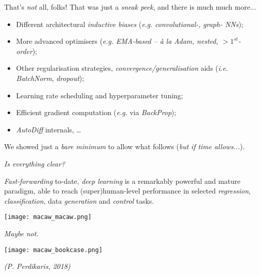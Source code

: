 {\begin{frame}{ That's \textit{not} all, folks!}
        That was just a \textit{sneak peek}, and there is much much more...
        \begin{itemize}
            \item Different architectural \alert{\textit{inductive biases}} (\textit{e.g. convolutional-, graph- NNs});
            \item More advanced optimisers (\textit{e.g. EMA-based -- à la Adam, nested, $>1^{\textit{st}}$-order});
            \item Other regularisation strategies, \textit{convergence/generalisation} aids (\textit{i.e.} \textit{BatchNorm}, \textit{dropout});
            \item Learning rate scheduling and hyperparameter tuning;
            \item \alert{Efficient} gradient computation (\textit{e.g.} via \textit{BackProp});
            \item \textit{AutoDiff} internals, \etc\dots
        \end{itemize}
    \hfill\break
    We showed just a \textit{bare minimum} to allow what follows (\textit{but if time allows...}).

    \end{frame}

    \begin{frame}{ \textit{Is everything clear?}}

    \textit{Fast-forwarding} to-date, \textit{deep learning} is a remarkably powerful and mature paradigm, able to reach (super)human-level performance in selected \textit{regression}, \textit{classification}, data \textit{generation} and \textit{control} tasks.

    \center \texttt{[image: macaw\_macaw.png]}
    \end{frame}

    \begin{frame}{ \textit{Maybe not.}}

    \center \texttt{[image: macaw\_bookcase.png]}

    \hspace*{14px}\textit{(P. Perdikaris, 2018)}
    \end{frame}
    \setcounter{footnote}{0}
}